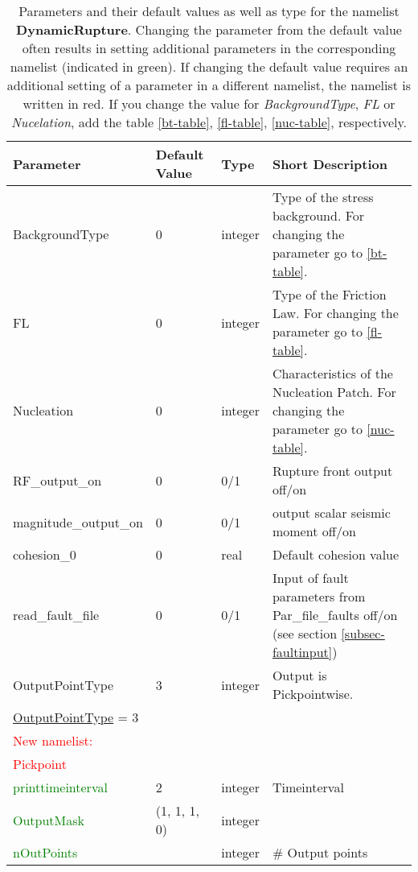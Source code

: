\documentclass[12pt,twoside]{article}
\begin{document}
\begin{longtable}{|p{4.8cm}|p{2.4cm}|p{2cm}|p{5cm}|}
\caption{Parameters and their default values as well as type for the namelist \textbf{DynamicRupture}.
         Changing the parameter from the default value often results in setting additional parameters
         in the corresponding namelist (indicated in green).
         If changing the default value requires an additional setting of a parameter in a different namelist,
         the namelist is written in red. If you change the value for
         \textit{BackgroundType}, \textit{FL} or \textit{Nucelation}, add the table \ref{bt-table},
         \ref{fl-table}, \ref{nuc-table}, respectively.} \\
\hline
Parameter & Default Value & Type & Short Description \\
\hline
\hline
BackgroundType & 0 & integer & Type of the stress background. For changing the parameter go to \ref{bt-table}.\\
\hline
FL & 0 & integer & Type of the Friction Law. For changing the parameter go to \ref{fl-table}.\\
\hline
Nucleation & 0 & integer &  Characteristics of the Nucleation Patch. For changing the parameter go to \ref{nuc-table}.\\
\hline
RF\_output\_on & 0 & 0/1 & Rupture front output off/on\\
\hline
magnitude\_output\_on & 0 & 0/1 & output scalar seismic moment off/on\\
\hline
cohesion\_0 & 0 & real & Default cohesion value\\
\hline
read\_fault\_file & 0 & 0/1 & Input of fault parameters from Par\_file\_faults off/on (see section \ref{subsec-faultinput})\\
\hline
OutputPointType & 3 & integer & Output is Pickpointwise.\\
\hdashline
\uline{OutputPointType} = 3 & & &\\
\textcolor{red}{New namelist:} & & &\\
\textcolor{red}{Pickpoint} & & &\\
\textcolor{green}{printtimeinterval} & 2 & integer & Timeinterval\\
\textcolor{green}{OutputMask} & (1, 1, 1, 0) & integer & \\
\textcolor{green}{nOutPoints} & & integer & \# Output points\\

\end{longtable}
\end{document}
